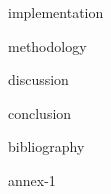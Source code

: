\documentclass[cic,tc,english,nominata]{resources/documentclass/iiufrgs}
\begin{document}
{implementation}


{methodology}


{discussion}


{conclusion}


{bibliography}


\appendix

{annex-1}

\end{document}
